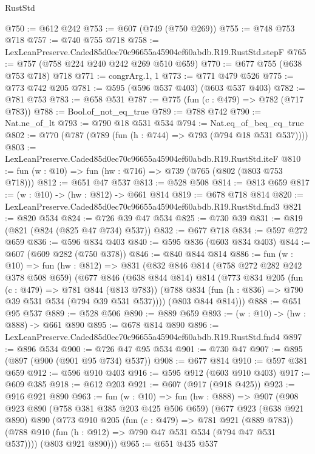 \begin{lexlean}{RustStd}
\begin{coremodule}
@750 := @612 @242
@753 := @607 (@749 (@750 @269))
@755 := @748 @753 @718
@757 := @740 @755 @718
@758 := LexLeanPreserve.Caded85d0ec70c96655a45904ef60abdb.R19.RustStd.stepF
@765 := @757 (@758 @224 @240 @242 @269 @510 @659)
@770 := @677 @755 (@638 @753 @718) @718
@771 := congrArg.{1, 1}
@773 := @771 @479 @526
@775 := @773 @742 @205
@781 := @595 (@596 @537 @403) (@603 @537 @403)
@782 := @781 @753
@783 := @658 @531
@787 := @775 (fun (c : @479) => @782 (@717 @783))
@788 := Bool.of_not_eq_true
@789 := @788 @742
@790 := Nat.ne_of_lt
@793 := @790 @18 @531 @534
@794 := Nat.eq_of_beq_eq_true
@802 := @770 (@787 (@789 (fun (h : @744) => @793 (@794 @18 @531 @537))))
@803 := LexLeanPreserve.Caded85d0ec70c96655a45904ef60abdb.R19.RustStd.iteF
@810 := fun (w : @10) => fun (hw : @716) => @739 (@765 (@802 (@803 @753 @718)))
@812 := @651 @47 @537
@813 := @528 @508
@814 := @813 @659
@817 := (w : @10) -> (hw : @812) -> @661 @814
@819 := @678 @718 @814
@820 := LexLeanPreserve.Caded85d0ec70c96655a45904ef60abdb.R19.RustStd.fnd3
@821 := @820 @534
@824 := @726 @39 @47 @534
@825 := @730 @39
@831 := @819 (@821 (@824 (@825 @47 @734) @537))
@832 := @677 @718
@834 := @597 @272 @659
@836 := @596 @834 @403
@840 := @595 @836 (@603 @834 @403)
@844 := @607 (@609 @282 (@750 @378))
@846 := @840 @844 @814
@886 := fun (w : @10) =>
  fun (hw : @812) =>
  @831
    (@832
      @846
      @814
      (@758 @272 @282 @242 @378 @508 @659)
      (@677
        @846
        (@638 @844 @814)
        @814
        (@773
          @834
          @205
          (fun (c : @479) => @781 @844 (@813 @783))
          (@788 @834 (fun (h : @836) => @790 @39 @531 @534 (@794 @39 @531 @537))))
        (@803 @844 @814)))
@888 := @651 @95 @537
@889 := @528 @506
@890 := @889 @659
@893 := (w : @10) -> (hw : @888) -> @661 @890
@895 := @678 @814 @890
@896 := LexLeanPreserve.Caded85d0ec70c96655a45904ef60abdb.R19.RustStd.fnd4
@897 := @896 @534
@900 := @726 @47 @95 @534
@901 := @730 @47
@907 := @895 (@897 (@900 (@901 @95 @734) @537))
@908 := @677 @814
@910 := @597 @381 @659
@912 := @596 @910 @403
@916 := @595 @912 (@603 @910 @403)
@917 := @609 @385
@918 := @612 @203
@921 := @607 (@917 (@918 @425))
@923 := @916 @921 @890
@963 := fun (w : @10) =>
  fun (hw : @888) =>
  @907
    (@908
      @923
      @890
      (@758 @381 @385 @203 @425 @506 @659)
      (@677
        @923
        (@638 @921 @890)
        @890
        (@773
          @910
          @205
          (fun (c : @479) => @781 @921 (@889 @783))
          (@788 @910 (fun (h : @912) => @790 @47 @531 @534 (@794 @47 @531 @537))))
        (@803 @921 @890)))
@965 := @651 @435 @537

\end{coremodule}
\end{lexlean}
